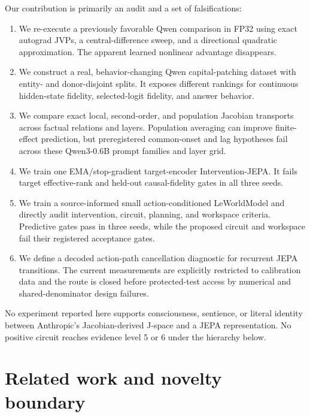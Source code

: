 \documentclass[10pt]{article}
\begin{document}
Our contribution is primarily an audit and a set of falsifications:

\begin{enumerate}[leftmargin=*]
  \item We re-execute a previously favorable Qwen comparison in FP32 using
  exact autograd JVPs, a central-difference sweep, and a directional quadratic
  approximation.  The apparent learned nonlinear advantage disappears.
  \item We construct a real, behavior-changing Qwen capital-patching dataset
  with entity- and donor-disjoint splits.  It exposes different rankings for
  continuous hidden-state fidelity, selected-logit fidelity, and answer
  behavior.
  \item We compare exact local, second-order, and population Jacobian
  transports across factual relations and layers.  Population averaging can
  improve finite-effect prediction, but preregistered common-onset and lag
  hypotheses fail across these Qwen3-0.6B prompt families and layer grid.
  \item We train one EMA/stop-gradient target-encoder
  Intervention-JEPA.  It fails target effective-rank and held-out causal-fidelity gates
  in all three seeds.
  \item We train a source-informed small action-conditioned LeWorldModel and directly
  audit intervention, circuit, planning, and workspace criteria.  Predictive
  gates pass in three seeds, while the proposed circuit and workspace fail
  their registered acceptance gates.
  \item We define a decoded action-path cancellation diagnostic for recurrent
  JEPA transitions.  The current measurements are explicitly restricted to
  calibration data and the route is closed before protected-test access by
  numerical and shared-denominator design failures.
\end{enumerate}

No experiment reported here supports consciousness, sentience, or literal
identity between Anthropic's Jacobian-derived J-space and a JEPA
representation.  No positive circuit reaches evidence level 5 or 6 under the
hierarchy below.

\section{Related work and novelty boundary}
\end{document}
